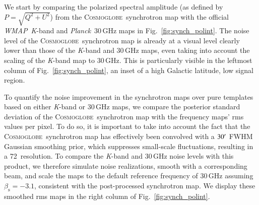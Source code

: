 \documentclass[twocolumn]{../../common/aa}
\def\WMAP{\emph{WMAP}}
\def\Planck{\emph{Planck}}
\newcommand{\cosmoglobe}{\textsc{Cosmoglobe}}
\newcommand{\K}[0]{\textit K}
\begin{document}
We start by comparing the polarized spectral amplitude (as defined by $P=\sqrt{Q^2+U^2}$) from the \cosmoglobe\ synchrotron map with the official \WMAP\ \K-band and \Planck\ 30\,GHz maps in Fig.~\ref{fig:synch_polint}. The noise level of the \cosmoglobe\ synchrotron map is already at a visual level clearly lower than those of the \K-band and 30\,GHz maps, even taking into account the scaling of the \K-band map to 30\,GHz.  This is particularly visible in the leftmost column of Fig.~\ref{fig:synch_polint}, an inset of a high Galactic latitude, low signal region.

To quantify the noise improvement in the synchrotron maps over pure templates based on either \K-band or 30\,GHz maps, we compare the posterior standard deviation of the \cosmoglobe\ synchrotron map with the frequency maps' rms values per pixel.
To do so, it is important to take into account the fact that the \cosmoglobe\ synchrotron map has effectively been convolved with a $30\arcm$ FWHM Gaussian smoothing prior, which suppresses small-scale fluctuations, resulting in a 72\arcmin\ resolution. To compare the \K-band and 30\,GHz noise levels with this product, we therefore simulate noise realizations, smooth with a corresponding beam, and scale the maps to the default reference frequency of 30\,GHz assuming $\beta_\mathrm s=-3.1$, consistent with the post-processed synchrotron map. We display these smoothed rms maps in the right column of Fig.~\ref{fig:synch_polint}.
\end{document}
